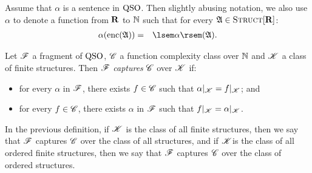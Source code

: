 
Assume that $\alpha$ is a sentence in ${\rm QSO}$. Then slightly abusing notation, we also use $\alpha$ to denote a function from $\mathbf{R}$ to $\mathbb{N}$ such that for every $\mathfrak{A} \in \text{\sc Struct}[\mathbf{R}] $:
\begin{eqnarray*}
\alpha(\enc(\A)) & = & \sem{\alpha}(\A).
\end{eqnarray*}
\begin{definition}
Let $\mathscr{F}$ a fragment of ${\rm QSO}$, $\mathscr{C}$ a function complexity class over $\mathbb{N}$ and $\mathscr{K}$ a class of finite structures. Then $\mathscr{F}$ {\em captures} $\mathscr{C}$ over $\mathscr{K}$ if:
\begin{itemize}
\item for every $\alpha$ in $\mathscr{F}$, there exists $f \in \mathscr{C}$ such that $\alpha|_{\mathscr{K}} = f|_{\mathscr{K}}$; and

\item for every $f \in \mathscr{C}$, there exists $\alpha$ in $\mathscr{F}$ such that $f|_{\mathscr{K}} = \alpha|_{\mathscr{K}}$.
\end{itemize}
\end{definition}
In the previous definition, if $\mathscr{K}$ is the class of all finite structures, then we say that $\mathscr{F}$ captures $\mathscr{C}$ over the class of all structures, and if $\mathscr{K}$is the class of all ordered finite structures, then we say that $\mathscr{F}$ captures $\mathscr{C}$ over the class of ordered structures. 


